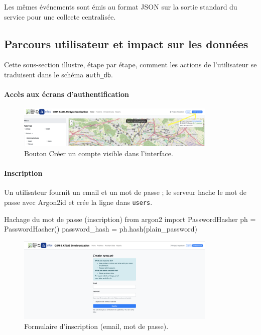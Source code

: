 \begin{itemize}
\noindent Les mêmes événements sont émis au format JSON sur la sortie standard du service pour une collecte centralisée.
\subsection{Parcours utilisateur et impact sur les données}
Cette sous-section illustre, étape par étape, comment les actions de l'utilisateur se traduisent dans le schéma \texttt{auth\_db}.

\paragraph{Accès aux écrans d'authentification}
\begin{figure}[h]
  \centering
  \includegraphics[width=0.85\textwidth]{../figures/chap10/auth1.png}
  \caption{Bouton \og Créer un compte \fg{} visible dans l'interface.}
\end{figure}

\paragraph{Inscription}
Un utilisateur fournit un email et un mot de passe ; le serveur hache le mot de passe avec Argon2id et crée la ligne dans \texttt{users}.

\begin{codebox}[language=Python]{Hachage du mot de passe (inscription)}
from argon2 import PasswordHasher
ph = PasswordHasher()
password_hash = ph.hash(plain_password)
\end{codebox}

\begin{figure}[h]
  \centering
  \includegraphics[width=0.85\textwidth]{../figures/chap10/create_account.png}
  \caption{Formulaire d'inscription (email, mot de passe).}
\end{figure}


\end{itemize}
